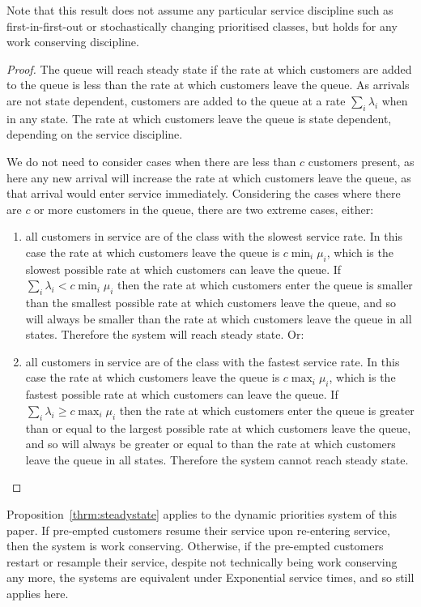 \documentclass{article}
\begin{document}
Note that this result does not assume any particular service discipline such as
first-in-first-out or stochastically changing prioritised classes, but holds for
any work conserving discipline.

\begin{proof}
The queue will reach steady state if the rate at which customers are added to
the queue is less than the rate at which customers leave the queue.
As arrivals are not state dependent, customers are added to the queue at a rate
$\sum_i \lambda_i$ when in any state.
The rate at which customers leave the queue is state dependent, depending on the
service discipline.

We do not need to consider cases when there are less than $c$ customers present,
as here any new arrival will increase the rate at which customers leave the
queue, as that arrival would enter service immediately.
Considering the cases where there are $c$ or more customers in the queue, there
are two extreme cases, either:

\begin{enumerate}
  \item all customers in service are of the class with the slowest service rate.
  In this case the rate at which customers leave the queue is $c \min_i \mu_i$,
  which is the slowest possible rate at which customers can leave the queue.
  If $\sum_i \lambda_i < c \min_i \mu_i$ then the rate at which customers enter
  the queue is smaller than the smallest possible rate at which customers leave
  the queue, and so will always be smaller than the rate at which customers
  leave the queue in all states. Therefore the system will reach steady state.
  Or:
  \item all customers in service are of the class with the fastest service rate.
  In this case the rate at which customers leave the queue is $c \max_i \mu_i$,
  which is the fastest possible rate at which customers can leave the queue.
  If $\sum_i \lambda_i \geq c \max_i \mu_i$ then the rate at which customers
  enter the queue is greater than or equal to the largest possible rate at which
  customers leave the queue, and so will always be greater or equal to than the
  rate at which customers leave the queue in all states. Therefore the system
  cannot reach steady state.
\end{enumerate}
\end{proof}

Proposition~\ref{thrm:steadystate} applies to the dynamic priorities system of
this paper. If pre-empted customers resume their service upon re-entering
service, then the system is work conserving. Otherwise, if the pre-empted
customers restart or resample their service, despite not technically being work
conserving any more, the systems are equivalent under Exponential service times,
and so still applies here.
\end{document}
